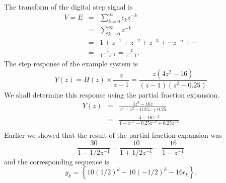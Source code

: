 The transform of the digital step signal is
\begin{eqnarray}\label{eq:l10e6}
  V = E &=& \sum_{k=0}^{\infty}\epsilon_k z^{-k}\\
        &=& \sum_{k=0}^{\infty} z^{-k}\nonumber \\
        &=& 1 + z^{-1} + z^{-2} + z^{-3} + \cdots z^{-n} + \cdots \nonumber\\
        &=& \frac{1}{1-z^{-1}} = \frac{z}{z-1}.
\end{eqnarray}
The step response of the example system is
\[ Y(z) = H(z)\times \frac{z}{z-1} = \frac{z(4z^2 - 16)}{(z-1)(z^2 - 0.25)}\]
We shall determine this response using the partial fraction
expansion.
\begin{eqnarray*}
Y(z) &=& \frac{4z^3 - 16z}{z^3 - z^2 - 0.25z + 0.25}\\
 &=& \frac{4 - 16z^{-2}}{1 - z^{-1} - 0.25z^{-2} + 0.25z^{-3}}\\
\end{eqnarray*}
Earlier we showed that the result of the partial
fraction expansion was
\[\frac{30}{1-1/2 z^{-1}} - \frac{10}{1+1/2z^{-1}} -
\frac{16}{1-z^{-1}}\] and the corresponding sequence is
\[y_k = \left\{10(1/2)^k -10(-1/2)^k -16\epsilon_k\right\}.\]


\endinput

